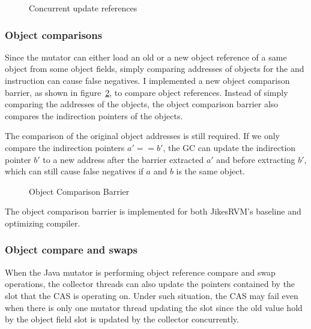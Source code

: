 \begin{figure}
  \centering
  
  \caption{Concurrent update references}
  \label{fig:concupdaterefs}
\end{figure}

\subsubsection{Object comparisons}

Since the mutator can either load an old or a new object reference of a same object
from some object fields, simply comparing addresses of objects for the  and 
instruction can cause false negatives. I implemented a new object comparison barrier,
as shown in figure~\ref{fig:objectcomparisonbarrier}, to compare object references.
Instead of simply comparing the addresses of the objects, the object comparison barrier also
compares the indirection pointers of the objects.

The comparison of the original object addresses is still required. If we only compare the
indirection pointers $a' == b'$, the GC can update the indirection pointer $b'$ to a new
address after the barrier extracted $a'$ and before extracting $b'$, which can still cause false
negatives if $a$ and $b$ is the same object.

\begin{figure}
  \centering
  
  \caption{Object Comparison Barrier}
  \label{fig:objectcomparisonbarrier}
\end{figure}

The object comparison barrier is implemented for both JikesRVM's baseline and optimizing compiler.

\subsubsection{Object compare and swaps}

When the Java mutator is performing object reference compare and swap operations,
the collector threads can also update the pointers contained by the slot that the CAS
is operating on. Under such situation, the CAS may fail even when there is only one mutator
thread updating the slot since the old value hold by the object field slot is updated
by the collector concurrently.

